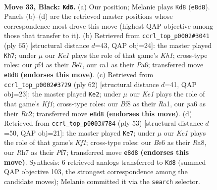 \documentclass[11pt]{article}
\begin{document}
\clearpage

\begin{figure}[p]\centering
\begin{subfigure}{0.46\textwidth}\centering
\resizebox{\linewidth}{!}{%
\newchessgame
\chessboard[
  setfen={2r1kb2/p1p2p1r/P1p1b1p1/2P1B2p/1P3P1P/8/8/RN2K2R b Q - 14 33},
  showmover=false,
  pgfstyle=straightmove, color=movearrow, markmove={e8-d8}
]}
\caption{}
\end{subfigure}\hfill
\begin{subfigure}{0.46\textwidth}\centering
\resizebox{\linewidth}{!}{%
\newchessgame
\chessboard[
  setfen={5r1k/1p2b1p1/p3rp1p/3pP2P/3P1B2/8/PP3RPK/5R2 b - - 1 33},
  showmover=false,
  pgfstyle=straightmove, color=movearrow, markmove={h8-h7}
]}
\caption{}
\end{subfigure}
\\[4pt]
\begin{subfigure}{0.46\textwidth}\centering
\resizebox{\linewidth}{!}{%
\newchessgame
\chessboard[
  setfen={1k1r2r1/1p3p2/p3pp2/8/1PPP3p/2B2PbP/2R3P1/R4K2 w - - 1 32},
  showmover=false,
  pgfstyle=straightmove, color=movearrow, markmove={f1-e2}
]}
\caption{}
\end{subfigure}\hfill
\begin{subfigure}{0.46\textwidth}\centering
\resizebox{\linewidth}{!}{%
\newchessgame
\chessboard[
  setfen={r1r2k2/p4ppp/1p3b2/P7/1P1p3P/3P2P1/3B1P2/1RR3K1 b - - 0 27},
  showmover=false,
  pgfstyle=straightmove, color=movearrow, markmove={f8-e7}
]}
\caption{}
\end{subfigure}
\caption{\textbf{Move 33, Black: \texttt{Kd8}.} (a) Our position; Melanie plays \texttt{Kd8} (\texttt{e8d8}). Panels (b)--(d) are the retrieved master positions whose correspondence most drove this move (highest QAP objective among those that transfer to it). (b) Retrieved from \texttt{ccrl\_top\_p0002\#3041} (ply 65) [structural distance $d$=43, QAP obj=24]: the master played \texttt{Kh7}; under $\mu$ our \emph{Ke1} plays the role of that game's \emph{Kh1}; cross-type roles: our \emph{p}f4 as their \emph{B}e7, our \emph{r}a1 as their \emph{P}a6; transferred move \texttt{e8d8} \textbf{(endorses this move)}. (c) Retrieved from \texttt{ccrl\_top\_p0002\#3729} (ply 62) [structural distance $d$=41, QAP obj=23]: the master played \texttt{Ke2}; under $\mu$ our \emph{Ke1} plays the role of that game's \emph{Kf1}; cross-type roles: our \emph{B}f8 as their \emph{R}a1, our \emph{p}a6 as their \emph{R}c2; transferred move \texttt{e8d8} \textbf{(endorses this move)}. (d) Retrieved from \texttt{ccrl\_top\_p0003\#784} (ply 53) [structural distance $d$=50, QAP obj=21]: the master played \texttt{Ke7}; under $\mu$ our \emph{Ke1} plays the role of that game's \emph{Kf1}; cross-type roles: our \emph{B}e6 as their \emph{R}a8, our \emph{R}h7 as their \emph{P}f7; transferred move \texttt{e8d8} \textbf{(endorses this move)}. Synthesis: 6 retrieved analogs transferred to \texttt{Kd8} (summed QAP objective 103, the strongest correspondence among the candidate moves); Melanie committed it via the \texttt{search} selector.}
\label{fig:thought-m65}
\end{figure}
\end{document}
